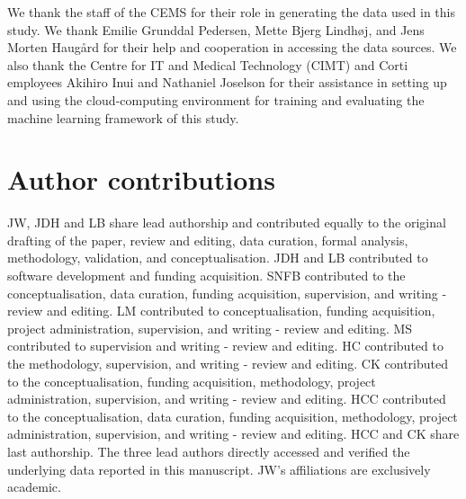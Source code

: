 {We thank the staff of the CEMS for their role in generating the data used in this study. We thank Emilie Grunddal Pedersen, Mette Bjerg Lindhøj, and Jens Morten Haugård for their help and cooperation in accessing the data sources. We also thank the Centre for IT and Medical Technology (CIMT) and Corti employees Akihiro Inui and Nathaniel Joselson for their assistance in setting up and using the cloud-computing environment for training and evaluating the machine learning framework of this study.


\section*{Author contributions}

JW, JDH and LB share lead authorship and contributed equally to the original drafting of the paper, review and editing, data curation, formal analysis, methodology, validation, and conceptualisation. JDH and LB contributed to software development and funding acquisition. SNFB contributed to the conceptualisation, data curation, funding acquisition, supervision, and writing - review and editing. LM contributed to conceptualisation, funding acquisition, project administration, supervision, and writing - review and editing. MS contributed to supervision and writing - review and editing. HC contributed to the methodology, supervision, and writing - review and editing. CK contributed to the conceptualisation, funding acquisition, methodology, project administration, supervision, and writing - review and editing. HCC contributed to the conceptualisation, data curation, funding acquisition, methodology, project administration, supervision, and writing - review and editing. HCC and CK share last authorship. The three lead authors directly accessed and verified the underlying data reported in this manuscript. JW's affiliations are exclusively academic.



}
